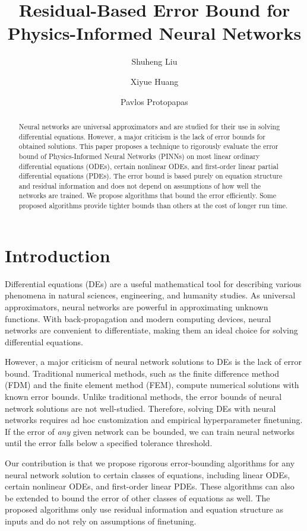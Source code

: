 \documentclass{uai2023}
\title{Residual-Based Error Bound for Physics-Informed Neural Networks}
\author[1]{Shuheng Liu}
\author[2]{Xiyue Huang}
\author[3]{Pavlos Protopapas}
\affil[1, 3]{
    Institute for Applied Computational Science\\
    Harvard University\\
    Cambridge, Massachusetts, USA
}
\affil[2]{
    Data Science Institute\\
    Columbia University\\
    New York, New York, USA
}
\begin{document}
\maketitle

\begin{abstract}
    Neural networks are universal approximators and are studied for their use in solving differential equations.
    However, a major criticism is the lack of error bounds for obtained solutions.
    This paper proposes a technique to rigorously evaluate the error bound of Physics-Informed Neural Networks (PINNs) on most linear ordinary differential equations (ODEs), certain nonlinear ODEs, and first-order linear partial differential equations (PDEs).
    The error bound is based purely on equation structure and residual information and does not depend on assumptions of how well the networks are trained.
    We propose algorithms that bound the error efficiently. 
    Some proposed algorithms provide tighter bounds than others at the cost of longer run time.
\end{abstract}

\section{Introduction}
    Differential equations (DEs) are a useful mathematical tool for describing various phenomena in natural sciences, engineering, and humanity studies. 
    As universal approximators, neural networks are powerful in approximating unknown functions. 
    With back-propagation and modern computing devices, neural networks are convenient to differentiate, making them an ideal choice for solving differential equations.

    However, a major criticism of neural network solutions to DEs is the lack of error bound. 
    Traditional numerical methods, such as the finite difference method (FDM) and the finite element method (FEM), compute numerical solutions with known error bounds.
    Unlike traditional methods, the error bounds of neural network solutions are not well-studied.
    Therefore, solving DEs with neural networks requires ad hoc customization and empirical hyperparameter finetuning.
    If the error of \textit{any} given network can be bounded, we can train neural networks until the error falls below a specified tolerance threshold.

    Our contribution is that we propose rigorous error-bounding algorithms for any neural network solution to certain classes of equations, including linear ODEs, certain nonlinear ODEs, and first-order linear PDEs.
    These algorithms can also be extended to bound the error of other classes of equations as well.
    The proposed algorithms only use residual information and equation structure as inputs and do not rely on assumptions of finetuning.
\end{document}
